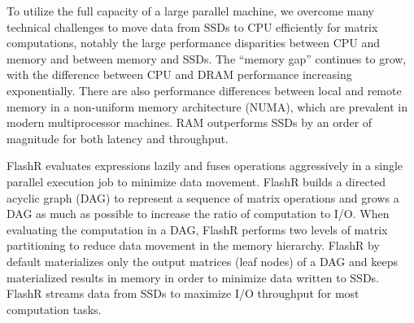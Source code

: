

To utilize the full capacity of a large parallel machine, we overcome
many technical challenges to move data from SSDs to CPU efficiently for matrix
computations,
notably the large performance disparities between CPU and memory and between
memory and SSDs. The ``memory gap'' \cite{Wilkes01} continues to grow, with 
the difference between CPU and DRAM performance increasing exponentially. 
There are also performance differences between
local and remote memory in a non-uniform memory architecture (NUMA), which are prevalent
in modern multiprocessor machines. 
RAM outperforms SSDs by an order of magnitude for both latency and throughput.

FlashR evaluates expressions lazily and fuses operations aggressively
in a single parallel execution job to minimize data movement. FlashR
builds a directed acyclic graph (DAG) to represent a sequence of matrix
operations and grows a DAG as much as possible to increase the ratio of
computation to I/O. When evaluating the computation in a DAG, FlashR
performs two levels of matrix partitioning to reduce data movement in
the memory hierarchy. FlashR by default materializes
only the output matrices (leaf nodes) of a DAG and keeps materialized results in
memory in order to minimize data written to SSDs. FlashR streams
data from SSDs to maximize I/O throughput for most computation tasks.



